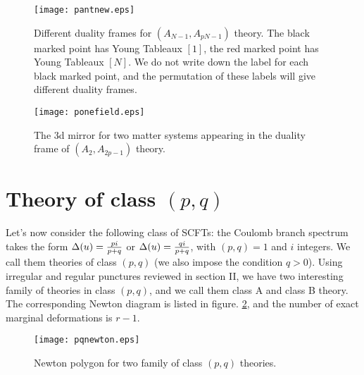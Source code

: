 \documentclass[a4paper,11pt]{article}
\begin{document}
\begin{figure}[h]
\centering
  \texttt{[image: pantnew.eps]}
  \caption{Different duality frames for $(A_{N-1}, A_{pN-1})$ theory. The black marked point has Young Tableaux $[1]$, the red marked point has Young Tableaux $[N]$. We do not write down the label for each black marked point, and the permutation of these labels will give different duality frames. }
\end{figure}

\begin{figure}[h]
\centering
  \texttt{[image: ponefield.eps]}
  \caption{The 3d mirror for two matter systems appearing in the duality frame of $(A_2, A_{2p-1})$ theory.}
  \label{poneduality2}
\end{figure}











\newpage
\section{Theory of class $(p,q)$}
Let's now consider the following class of SCFTs: the Coulomb branch spectrum takes the form $\Delta(u)= {p i\over p+q}$ or $\Delta (u)= {q i\over p+q}$, with $(p,q)=1$ and $i$ integers.
We call them theories of class $(p,q)$ (we also impose the condition $q> 0$).  Using irregular and regular punctures reviewed in section II, we have two interesting family of theories in class $(p,q)$, and 
we call them class A and class B theory. The corresponding Newton diagram is listed in figure. \ref{pqnewton}, and the number of exact marginal deformations is $r-1$.
\begin{figure}[h]
\centering
  \texttt{[image: pqnewton.eps]}
  \caption{Newton polygon for two family of class $(p,q)$ theories.}
  \label{pqnewton}
\end{figure}
\end{document}
